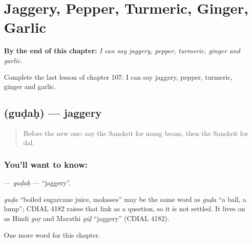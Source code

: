 
\chapter{Jaggery, Pepper, Turmeric, Ginger, Garlic}
\label{ch:sa-jaggery-pepper-turmeric-ginger-garlic}

\begin{chapteropening}
\textbf{By the end of this chapter:} \emph{I can say jaggery, pepper, turmeric, ginger and garlic.}

Complete the last lesson of chapter 107: I can say jaggery, pepper, turmeric, ginger and garlic.
\end{chapteropening}

\section[\texorpdfstring{\sk{गुडः} (guḍaḥ)}{गुडः (guḍaḥ)}]{ (guḍaḥ) — jaggery}

\label{lesson:SA-C107-gudah}



\begin{quote}
Before the new one: say the Sanskrit for mung beans, then the Sanskrit for dal.
\end{quote}

\subsection*{You'll want to know: }
\textbf{} — \emph{guḍaḥ} — \textquotedblleft{}jaggery\textquotedblright{}.

\begin{cousinweb}
\emph{guḍa} \textquotedblleft{}boiled sugarcane juice, molasses\textquotedblright{} may be the same word as \emph{guḍa} \textquotedblleft{}a ball, a lump\textquotedblright{}; CDIAL 4182 raises that link as a question, so it is not settled. It lives on as Hindi \emph{guṛ} and Marathi \emph{gūḷ} \textquotedblleft{}jaggery\textquotedblright{} (CDIAL 4182).
\end{cousinweb}

\begin{grammarlens}[title={What you've built}]
One more word for this chapter.
\end{grammarlens}

